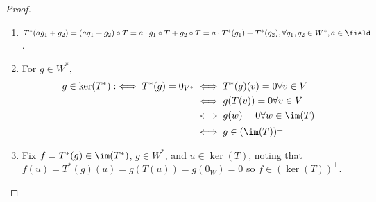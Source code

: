 \begin{proof}
    \begin{enumerate}
        \item $T^\ast(ag_1 + g_2) = (ag_1 + g_2)\circ T = a \cdot g_1 \circ T + g_2 \circ T = a \cdot T^{\ast}(g_1) + T^\ast(g_2), \forall g_1, g_2 \in W^\ast, a \in \field$.
        \item For $g \in W^\ast$, \begin{align*}
            g \in \ker(T^\ast) :\iff T^\ast(g) = 0_{V^\ast} &\iff T^\ast(g)(v) = 0 \forall v \in V\\
            &\iff g(T(v)) = 0 \forall v \in V\\
            &\iff g(w) = 0 \forall w \in \im(T)\\
            &\iff g \in (\im(T))^\perp
        \end{align*}
        \item Fix $f = T^\ast(g) \in \im(T^\ast)$, $g \in W^\ast$, and $u \in \ker(T)$, noting that $f(u) = T^\ast(g)(u) = g(T(u)) = g(0_W) = 0$ so $f \in (\ker(T))^\perp$.
    \end{enumerate}
\end{proof}